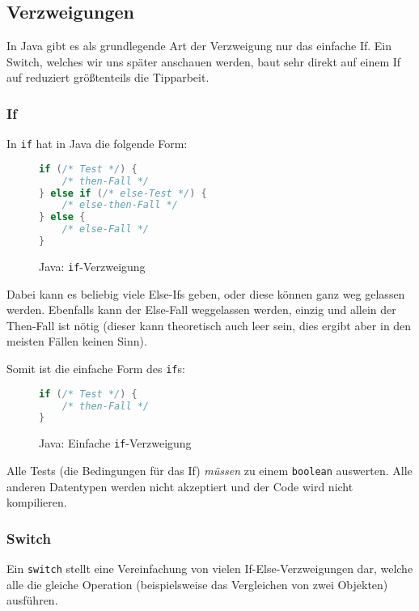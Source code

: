 \subsection{Verzweigungen}

	In Java gibt es als grundlegende Art der Verzweigung nur das einfache If. Ein Switch, welches wir uns später anschauen werden, baut sehr direkt auf einem If auf reduziert größtenteils die Tipparbeit.

	\subsubsection{If}
		In \texttt{if} hat in Java die folgende Form:
		\begin{figure}[H]
			\centering
			\begin{lstlisting}[language = Java]
if (/* Test */) {
	/* then-Fall */
} else if (/* else-Test */) {
	/* else-then-Fall */
} else {
	/* else-Fall */
}
			\end{lstlisting}
			\caption{Java: \texttt{if}-Verzweigung}
		\end{figure}
		
		Dabei kann es beliebig viele Else-Ifs geben, oder diese können ganz weg gelassen werden. Ebenfalls kann der Else-Fall weggelassen werden, einzig und allein der Then-Fall ist nötig (dieser kann theoretisch auch leer sein, dies ergibt aber in den meisten Fällen keinen Sinn).
		
		Somit ist die einfache Form des \texttt{if}s:
		\begin{figure}[H]
			\centering
			\begin{lstlisting}[language = Java]
if (/* Test */) {
	/* then-Fall */
}
			\end{lstlisting}
			\caption{Java: Einfache \texttt{if}-Verzweigung}
		\end{figure}
		
		Alle Tests (die Bedingungen für das If) \textit{müssen} zu einem \texttt{boolean} auswerten. Alle anderen Datentypen werden nicht akzeptiert und der Code wird nicht kompilieren.
	
	\subsubsection{Switch}
		Ein \texttt{switch} stellt eine Vereinfachung von vielen If-Else-Verzweigungen dar, welche alle die gleiche Operation (beispielsweise das Vergleichen von zwei Objekten) ausführen.
		

